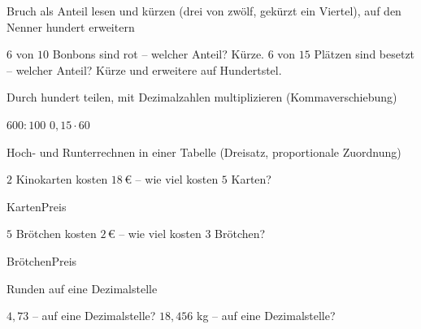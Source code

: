 \setcounter{aufgabe}{0}

\begin{aufgabe}{Bruch als Anteil lesen und kürzen (drei von zwölf, gekürzt ein Viertel), auf den Nenner hundert erweitern}
\begin{teile}
\teil $6$ von $10$ Bonbons sind rot – welcher Anteil? Kürze. \leerfeld
\teil $6$ von $15$ Plätzen sind besetzt – welcher Anteil? Kürze und erweitere auf Hundertstel. \leerfeld
\end{teile}
\end{aufgabe}

\begin{aufgabe}{Durch hundert teilen, mit Dezimalzahlen multiplizieren (Kommaverschiebung)}
\begin{teile}
\teil $600 : 100$ \leerfeld
\teil $0{,}15 \cdot 60$ \leerfeld
\end{teile}
\end{aufgabe}

\begin{aufgabe}{Hoch- und Runterrechnen in einer Tabelle (Dreisatz, proportionale Zuordnung)}
\begin{teile}
\teil $2$ Kinokarten kosten $18\,€$ – wie viel kosten $5$ Karten?

\begin{dreisatz}{Karten}{Preis}\dsp{\phantom{:0}}{\phantom{:0}}\dsp{\phantom{:0}}{\phantom{:0}}\end{dreisatz}
\teil $5$ Brötchen kosten $2\,€$ – wie viel kosten $3$ Brötchen?

\begin{dreisatz}{Brötchen}{Preis}\dsp{\phantom{:0}}{\phantom{:0}}\dsp{\phantom{:0}}{\phantom{:0}}\end{dreisatz}
\end{teile}
\end{aufgabe}

\begin{aufgabe}{Runden auf eine Dezimalstelle}
\begin{teile}
\teil $4{,}73$ – auf eine Dezimalstelle? \leerfeld
\teil $18{,}456$ kg – auf eine Dezimalstelle? \leerfeld[kg]
\end{teile}
\end{aufgabe}
